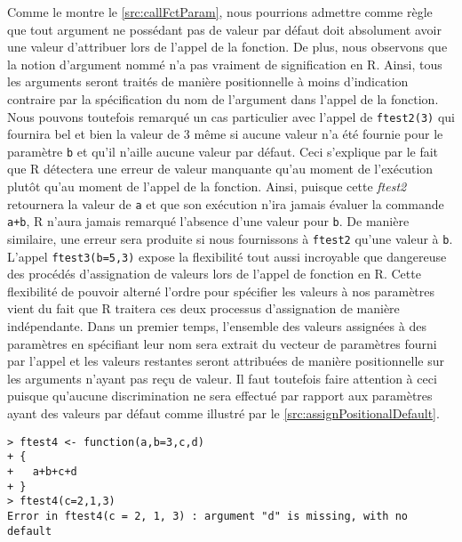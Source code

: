 \vspace{\baselineskip}
\noindent
Comme le montre le \autoref{src:callFctParam}, nous pourrions admettre comme règle que tout argument ne possédant pas de valeur par défaut doit absolument avoir une valeur d'attribuer lors de l'appel de la fonction. De plus, nous observons que la notion d'argument nommé n'a pas vraiment de signification en R. Ainsi, tous les arguments seront traités de manière positionnelle à moins d'indication contraire par la spécification du nom de l'argument dans l'appel de la fonction. Nous pouvons toutefois remarqué un cas particulier avec l'appel de \texttt{ftest2(3)} qui fournira bel et bien la valeur de 3 même si aucune valeur n'a été fournie pour le paramètre \texttt{b} et qu'il n'aille aucune valeur par défaut. Ceci s'explique par le fait que R détectera une erreur de valeur manquante qu'au moment de l'exécution plutôt qu'au moment de l'appel de la fonction. Ainsi, puisque cette \emph{ftest2} retournera la valeur de \texttt{a} et que son exécution n'ira jamais évaluer la commande \texttt{a+b}, R n'aura jamais remarqué l'absence d'une valeur pour \texttt{b}. De manière similaire, une erreur sera produite si nous fournissons à \texttt{ftest2} qu'une valeur à \texttt{b}. L'appel \texttt{ftest3(b=5,3)} expose la flexibilité tout aussi incroyable que dangereuse des procédés d'assignation de valeurs lors de l'appel de fonction en R. Cette flexibilité de pouvoir alterné l'ordre pour spécifier les valeurs à nos paramètres vient du fait que R traitera ces deux processus d'assignation de manière indépendante. Dans un premier temps, l'ensemble des valeurs assignées à des paramètres en spécifiant leur nom sera extrait du vecteur de paramètres fourni par l'appel et les valeurs restantes seront attribuées de manière positionnelle sur les arguments n'ayant pas reçu de valeur. Il faut toutefois faire attention à ceci puisque qu'aucune discrimination ne sera effectué par rapport aux paramètres ayant des valeurs par défaut comme illustré par le \autoref{src:assignPositionalDefault}.

\begin{lstlisting}[caption = L'assignation et les valeurs par défaut,label=src:assignPositionalDefault]
> ftest4 <- function(a,b=3,c,d)
+ {
+   a+b+c+d
+ }
> ftest4(c=2,1,3)
Error in ftest4(c = 2, 1, 3) : argument "d" is missing, with no default
\end{lstlisting}

